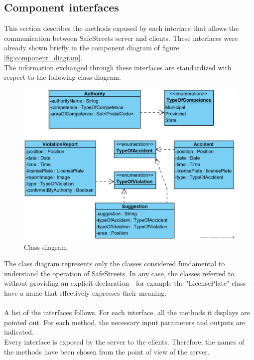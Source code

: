\documentclass{article}
\begin{document}
		\subsection{Component interfaces}
		This section describes the methods exposed by each interface that allows the communication between SafeStreets server and clients. These interfaces were already shown briefly in the component diagram of figure \ref{fig:component_diagram}.\\
		The information exchanged through these interfaces are standardized with respect to the following class diagram.\\
		\begin{figure}[H]
			\includegraphics {diagrams/class_diagram.png}
			\caption[Class diagram]{Class diagram}
			\label{fig:class_diagram}
		\end{figure}
		The class diagram represents only the classes considered fundamental to understand the operation of SafeStreets. In any case, the classes referred to without providing an explicit declaration - for example the "LicensePlate" class - have a name that effectively expresses their meaning.\\
		\\
		A list of the interfaces follows. For each interface, all the methods it displays are pointed out. For each method, the necessary input parameters and outputs are indicated.\\
		Every interface is exposed by the server to the clients. Therefore, the names of the methods have been chosen from the point of view of the server.\\
\end{document}
